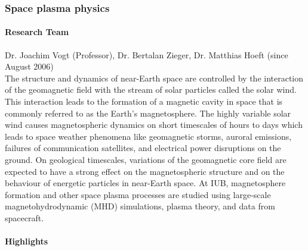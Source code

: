 
\subsubsection{Space plasma physics}
\label{GeoAstro:Vogt}

\paragraph{Research Team}
Dr. Joachim Vogt (Professor), Dr. Bertalan Zieger,
Dr. Matthias Hoeft (since August 2006)\\

The structure and dynamics of near-Earth space are controlled
by the interaction of the geomagnetic field with the stream
of solar particles called the solar wind.  This interaction
leads to the formation of a magnetic cavity in space that is
commonly referred to as the Earth's magnetosphere.  The highly variable
solar wind causes magnetospheric dynamics on short timescales of hours
to days which leads to space weather phenomena like geomagnetic
storms, auroral emissions, failures of communication satellites, and
electrical power disruptions on the ground.  On geological timescales,
variations of the geomagnetic core field are expected to have
a strong effect on the magnetospheric structure and on the behaviour of
energetic particles in near-Earth space.  At IUB, magnetosphere formation
and other space plasma processes are studied using large-scale
magnetohydrodynamic (MHD) simulations, plasma theory, and data
from spacecraft.


\paragraph{Highlights}

